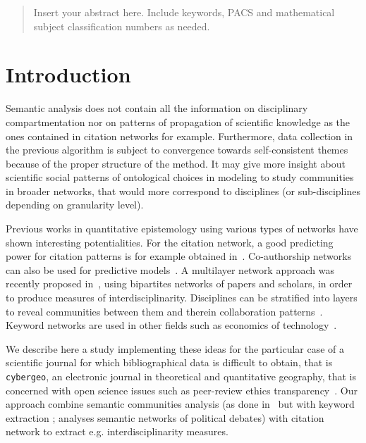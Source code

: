 \date{Received: date / Accepted: date}



\maketitle

\begin{abstract}
Insert your abstract here. Include keywords, PACS and mathematical
subject classification numbers as needed.
\end{abstract}

\section{Introduction}
\label{sec:intro}




Semantic analysis does not contain all the information on disciplinary compartmentation nor on patterns of propagation of scientific knowledge as the ones contained in citation networks for example. Furthermore, data collection in the previous algorithm is subject to convergence towards self-consistent themes because of the proper structure of the method. It may give more insight about scientific social patterns of ontological choices in modeling to study communities in broader networks, that would more correspond to disciplines (or sub-disciplines depending on granularity level).

Previous works in quantitative epistemology using various types of networks have shown interesting potentialities. For the citation network, a good predicting power for citation patterns is for example obtained in~\cite{2013arXiv1310.8220N}. Co-authorship networks can also be used for predictive models~\cite{2014arXiv1402.7268S}. A multilayer network approach was recently proposed in~\cite{2016arXiv160106075O}, using bipartites networks of papers and scholars, in order to produce measures of interdisciplinarity. Disciplines can be stratified into layers to reveal communities between them and therein collaboration patterns~\cite{2015arXiv150601280B}. Keyword networks are used in other fields such as economics of technology~\cite{choi2014patent,shibata2008detecting}.

We describe here a study implementing these ideas for the particular case of a scientific journal for which bibliographical data is difficult to obtain, that is \texttt{cybergeo}, an electronic journal in theoretical and quantitative geography, that is concerned with open science issues such as peer-review ethics transparency~\cite{10.1371/journal.pone.0147913}. Our approach combine semantic communities analysis (as done in~\cite{2016arXiv160208451P} but with keyword extraction ; \cite{2015arXiv151003797G} analyses semantic networks of political debates) with citation network to extract e.g. interdisciplinarity measures.




